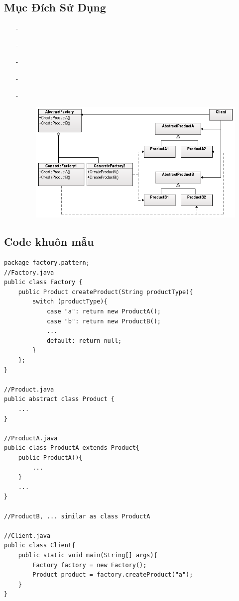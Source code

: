 \documentclass{article}
\newcommand\subpara{\fontsize{13}{13}\selectfont \fontseries{b}\selectfont}
\begin{document}
    \subsection{Mục Đích Sử Dụng}
    \begin{itemize}
        \item[-]\subpara{Tạo ra một cách mới trong việc khởi tạo đối tượng thông qua một interface chung}
        \item[-]\subpara{Che giấu đi xử lý logic của việc khởi tạo đối tượng}
        \item[-]\subpara{Giảm sự phụ thuộc giữa các module và tăng tính mở rộng code}
        \item[-]\subpara{Khi Factory có quá nhiều trường hợp, sử dụng Abstract Factory giúp phân tách điều kiện đơn giản hóa logic}
        \item[-]\subpara{Mô hình cho Abstract Factory:}
        \begin{figure}[htp]
                \includegraphics[scale=0.7]{./image/abstract-factory-pattern.png}
        \end{figure}
    \end{itemize}


    \subsection{Code khuôn mẫu}
    \begin{lstlisting}
package factory.pattern;
//Factory.java
public class Factory {
    public Product createProduct(String productType){
        switch (productType){
            case "a": return new ProductA();
            case "b": return new ProductB();
            ...
            default: return null;
        }
    };
}

//Product.java
public abstract class Product {
    ...
}

//ProductA.java
public class ProductA extends Product{
    public ProductA(){
        ...
    }
    ...
}

//ProductB, ... similar as class ProductA

//Client.java
public class Client{
    public static void main(String[] args){
        Factory factory = new Factory();
        Product product = factory.createProduct("a");
    }
}
    \end{lstlisting}
\end{document}
